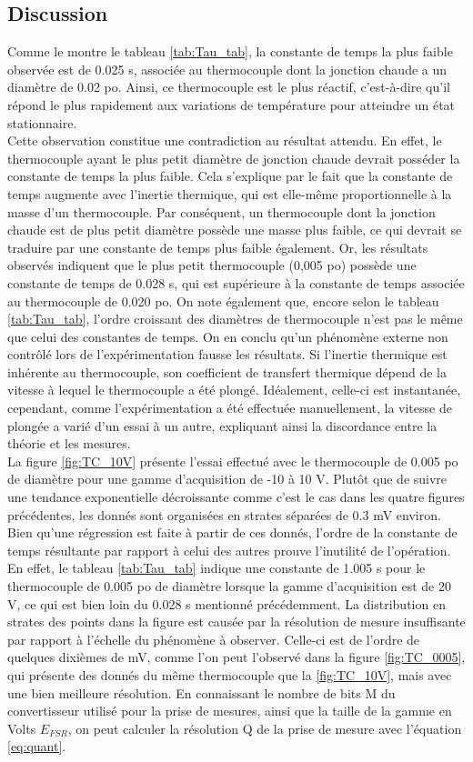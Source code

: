 \documentclass[11pt,twoside]{article}
\numberwithin{figure}{section}
\begin{document}
\subsection{Discussion}
Comme le montre le tableau \ref{tab:Tau_tab}, la constante de temps la plus faible observée est de 0.025 s, associée au thermocouple dont la jonction chaude a un diamètre de 0.02 po. Ainsi, ce thermocouple est le plus réactif, c'est-à-dire qu'il répond le plus rapidement aux variations de température pour atteindre un état stationnaire.
\\
Cette observation constitue une contradiction au résultat attendu. En effet, le thermocouple ayant le plus petit diamètre de jonction chaude devrait posséder la constante de temps la plus faible. Cela s'explique par le fait que la constante de temps augmente avec l'inertie thermique, qui est elle-même proportionnelle à la masse d'un thermocouple. Par conséquent, un thermocouple dont la jonction chaude est de plus petit diamètre possède une masse plus faible, ce qui devrait se traduire par une constante de temps plus faible également. Or, les résultats observés indiquent que le plus petit thermocouple (0,005 po) possède une constante de temps de 0.028 s, qui est supérieure à la constante de temps associée au thermocouple de 0.020 po. On note également que, encore selon le tableau \ref{tab:Tau_tab}, l'ordre croissant des diamètres de thermocouple n'est pas le même que celui des constantes de temps. On en conclu qu'un phénomène externe non contrôlé lors de l'expérimentation fausse les résultats. Si l'inertie thermique est inhérente au thermocouple, son coefficient de transfert thermique dépend de la vitesse à lequel le thermocouple a été plongé. Idéalement, celle-ci est instantanée, cependant, comme l'expérimentation a été effectuée manuellement, la vitesse de plongée a varié d'un essai à un autre, expliquant ainsi la discordance entre la théorie et les mesures.\cite{huang2024thermocouple}
\\
La figure \ref{fig:TC_10V} présente l'essai effectué avec le thermocouple de 0.005 po de diamètre pour une gamme d'acquisition de -10 à 10 V. Plutôt que de suivre une tendance exponentielle décroissante comme c'est le cas dans les quatre figures précédentes, les donnés sont organisées en strates séparées de 0.3 mV environ. Bien qu'une régression est faite à partir de ces donnés, l'ordre de la constante de temps résultante par rapport à celui des autres prouve l'inutilité de l'opération. En effet, le tableau \ref{tab:Tau_tab} indique une constante de 1.005 s pour le thermocouple de 0.005 po de diamètre lorsque la gamme d'acquisition est de 20 V, ce qui est bien loin du 0.028 s mentionné précédemment. La distribution en strates des points dans la figure est causée par la résolution de mesure insuffisante par rapport à l'échelle du phénomène à observer. Celle-ci est de l'ordre de quelques dixièmes de mV, comme l'on peut l'observé dans la figure \ref{fig:TC_0005}, qui présente des donnés du même thermocouple que la \ref{fig:TC_10V}, mais avec une bien meilleure résolution.  En connaissant le nombre de bits M  du convertisseur utilisé pour la prise de mesures, ainsi que la taille de la gamme en Volts $E_{FSR}$, on peut calculer la résolution Q de la prise de mesure avec l'équation \ref{eq:quant}.
\end{document}
